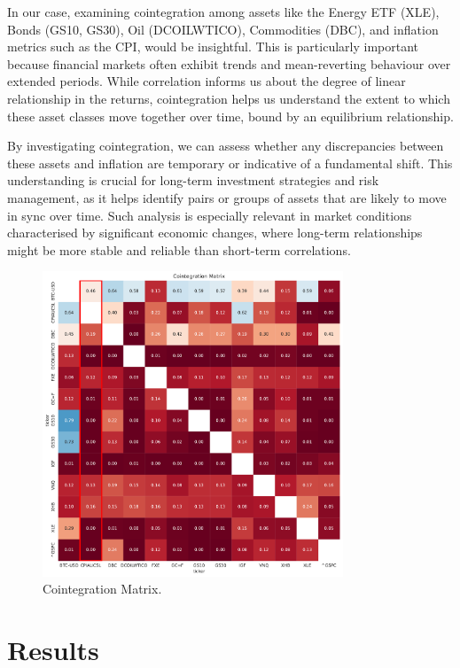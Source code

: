 \documentclass{article}
\begin{document}
In our case, examining cointegration among assets like the Energy ETF (XLE), Bonds (GS10, GS30), Oil (DCOILWTICO), Commodities (DBC), and inflation metrics such as the CPI, would be insightful. This is particularly important because financial markets often exhibit trends and mean-reverting behaviour over extended periods. While correlation informs us about the degree of linear relationship in the returns, cointegration helps us understand the extent to which these asset classes move together over time, bound by an equilibrium relationship.

By investigating cointegration, we can assess whether any discrepancies between these assets and inflation are temporary or indicative of a fundamental shift. This understanding is crucial for long-term investment strategies and risk management, as it helps identify pairs or groups of assets that are likely to move in sync over time. Such analysis is especially relevant in market conditions characterised by significant economic changes, where long-term relationships might be more stable and reliable than short-term correlations.

\begin{figure}[H]
    \centering
    \includegraphics[width=0.8\textwidth]{figure/Cointegration_Matrix.pdf}
    \caption{Cointegration Matrix.}
    \label{fig:mesh3}
\end{figure}

\section{Results}
\end{document}
